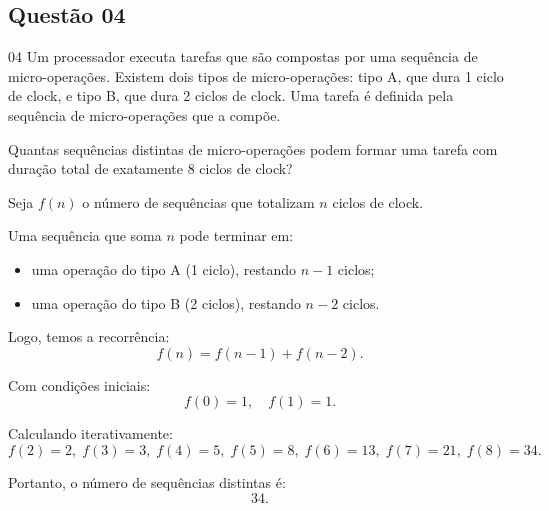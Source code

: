 \subsection*{Questão 04}

\begin{questionbox}{04}
  Um processador executa tarefas que são compostas por uma sequência de micro-operações. Existem dois tipos de micro-operações: tipo A, que dura 1 ciclo de clock, e tipo B, que dura 2 ciclos de clock. Uma tarefa é definida pela sequência de micro-operações que a compõe.

  Quantas sequências distintas de micro-operações podem formar uma tarefa com duração total de exatamente 8 ciclos de clock?
\end{questionbox}

\begin{solutionbox}
  Seja $f(n)$ o número de sequências que totalizam $n$ ciclos de clock.

  Uma sequência que soma $n$ pode terminar em:
  \begin{itemize}
    \item uma operação do tipo A (1 ciclo), restando $n-1$ ciclos;
    \item uma operação do tipo B (2 ciclos), restando $n-2$ ciclos.
  \end{itemize}

  Logo, temos a recorrência:
  \[
  f(n) = f(n-1) + f(n-2).
  \]

  Com condições iniciais:
  \[
  f(0) = 1, \quad f(1) = 1.
  \]
  \end{solutionbox}

  \begin{solutionbox}
  Calculando iterativamente:
  \[
  f(2)=2,\; f(3)=3,\; f(4)=5,\; f(5)=8,\; f(6)=13,\; f(7)=21,\; f(8)=34.
  \]

  Portanto, o número de sequências distintas é:
  \[
  \boxed{34}.
  \]
\end{solutionbox}